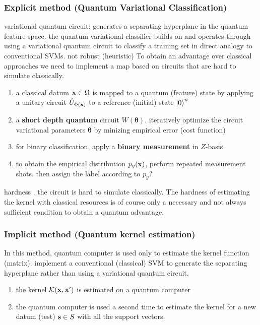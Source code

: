 \subsubsection*{Explicit method (Quantum Variational Classification)}
variational quantum circuit: generates a separating hyperplane in the quantum feature space.
the quantum variational classifier builds on \cite{mitaraiQuantumCircuitLearning2018} \cite{farhiClassificationQuantumNeural2018} and operates through using a variational quantum circuit to classify a training set in direct analogy to conventional SVMs.
not robust (heuristic)
To obtain an advantage over classical approaches we need to implement a map based on circuits that are hard to simulate classically.
\begin{enumerate}
	\item a classical datum $\vb{x}\in\Omega$ is mapped to a quantum (feature) state by applying a unitary circuit $\hat{U}_{\Phi(\vb{x})}$ to a reference (initial) state $\ket{0}^n$
	\item a \textbf{short depth quantum} circuit $W(\pmb{\theta})$.
	iteratively optimize the circuit variational parameters $\pmb{\theta}$ 
	by minizing empirical error (cost function)
	\item for binary classification, apply a \textbf{binary measurement} in $Z$-basis
	\item to obtain the empirical distribution $p_y(\vb{x})$, perform repeated measurement shots.
	then assign the label according to $p_y$?
\end{enumerate}
hardness \cite{bremnerAveragecaseComplexityApproximate2016}.
the circuit is hard to simulate classically.
The hardness of estimating the kernel with classical resources is of course only a necessary and not always sufficient condition to obtain a quantum advantage.

\subsubsection*{Implicit method (Quantum kernel estimation)}
In this method, quantum computer is used only to estimate the kernel function (matrix).
implement a conventional (classical) SVM to generate the separating hyperplane
rather than using a variational quantum circuit.
\begin{enumerate}
	\item the kernel $\mathcal{K}(\vb{x},\vb{x}')$ is estimated on a quantum computer
	\item the quantum computer is used a second time to estimate the kernel for a new datum (test) $\vb{s}\in S$ with all the support vectors.
\end{enumerate}

